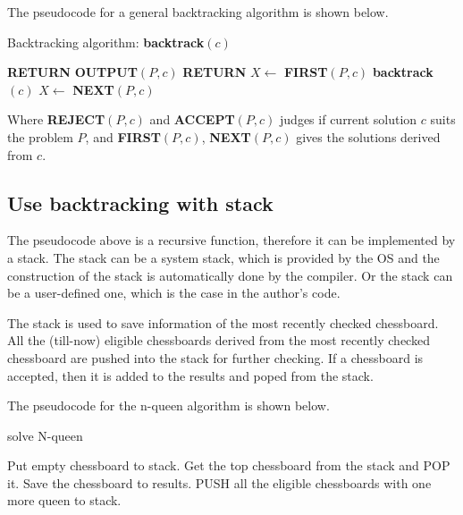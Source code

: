 \documentclass[cn,black,12pt,normal]{elegantnote}
\begin{document}
The pseudocode for a general backtracking algorithm is shown below.

\begin{algorithm}[H]
    \caption{Backtracking algorithm: \textbf{backtrack}$(c)$}
    \label{alg1}
    \begin{algorithmic}
        \STATE \textbf{RETURN}
        \ENDIF
        \STATE \textbf{OUTPUT}$(P,c)$
        \STATE \textbf{RETURN}
        \ENDIF
        \STATE $X \gets$ \textbf{FIRST}$(P,c)$
        \STATE \textbf{backtrack}$(c)$
        \STATE $X \gets$ \textbf{NEXT}$(P,c)$
        \ENDWHILE
    \end{algorithmic}
\end{algorithm}

Where \textbf{REJECT}$(P,c)$ and \textbf{ACCEPT}$(P,c)$ judges if current solution $c$ suits the problem $P$, and \textbf{FIRST}$(P,c)$, \textbf{NEXT}$(P,c)$ gives the solutions derived from $c$.

\subsection{Use backtracking with stack}
The pseudocode above is a recursive function, therefore it can be implemented by a stack. The stack can be a system stack, which is provided by the OS and the construction of the stack is automatically done by the compiler. Or the stack can be a user-defined one, which is the case in the author's code.

The stack is used to save information of the most recently checked chessboard. All the (till-now) eligible chessboards derived from the most recently checked chessboard are pushed into the stack for further checking. If a chessboard is accepted, then it is added to the results and poped from the stack.

The pseudocode for the n-queen algorithm is shown below.
\begin{algorithm}[H]
    \caption{solve N-queen}
    \label{alg2}
    \begin{algorithmic}
        \STATE Put empty chessboard to stack.
        \STATE Get the top chessboard from the stack and POP it.
        \STATE Save the chessboard to results.
        \ELSE
        \STATE PUSH all the eligible chessboards with one more queen to stack.
        \ENDIF
        \ENDWHILE
    \end{algorithmic}
\end{algorithm}
\end{document}
